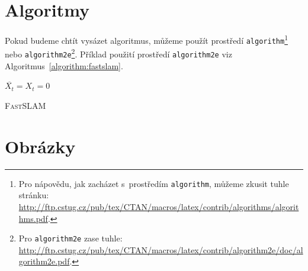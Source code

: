 \documentclass[a4paper, 11pt, a4paper]{article}
\begin{document}
\pagebreak

\section{Algoritmy}
\label{section:algorithm}
Pokud budeme chtít vysázet algoritmus, můžeme použít prostředí
\texttt{algorithm}\footnote{Pro nápovědu, jak zacházet s~prostředím \texttt{algorithm}, můžeme zkusit tuhle stránku: \\ \href{http://ftp.cstug.cz/pub/tex/CTAN/macros/latex/contrib/algorithms/algorithms.pdf}{http://ftp.cstug.cz/pub/tex/CTAN/macros/latex/contrib/algorithms/algorithms.pdf}.} nebo 
\texttt{algorithm2e}\footnote{Pro \texttt{algorithm2e} zase tuhle: \href{http://ftp.cstug.cz/pub/tex/CTAN/macros/latex/contrib/algorithm2e/doc/algorithm2e.pdf}{http://ftp.cstug.cz/pub/tex/CTAN/macros/latex/contrib/algorithm2e/doc/algorithm2e.pdf}.}. Příklad použití prostředí \texttt{algorithm2e} viz Algoritmus~\ref{algorithm:fastslam}.

\vspace{2em}

\IncMargin{1.5em}
\begin{algorithm}[H]
    \SetNlSty{}{}{:}
	\Indm\Indmm
    \Indp\Indpp
    \BlankLine
    $ \overline{X_t} = X_t = 0 $ \\

    \caption{\textsc{FastSLAM}}
	\label{algorithm:fastslam}
\end{algorithm}
\DecMargin{1.5em}

\section{Obrázky}
\end{document}
